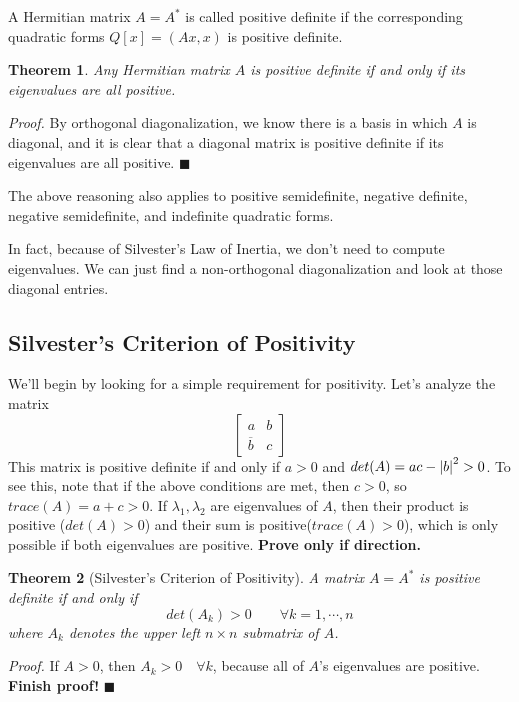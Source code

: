 \documentclass[a4paper,10pt]{book}
\theoremstyle{plain}
\newtheorem{theorem}{Theorem}[section]
\renewenvironment{proof}{\textsl{Proof.}}{\hfill$\blacksquare$}
\theoremstyle{plain}
\theoremstyle{definition}
\begin{document}
A Hermitian matrix $A = A^{*}$ is called positive definite if the corresponding quadratic forms $Q[x] = (Ax, x)$ is positive definite. 

\begin{theorem}
Any Hermitian matrix $A$ is positive definite if and only if its eigenvalues are all positive.
\end{theorem}

\begin{proof}
By orthogonal diagonalization, we know there is a basis in which $A$ is diagonal, and it is clear that a diagonal matrix is positive definite if its eigenvalues are all positive. 
\end{proof}

The above reasoning also applies to positive semidefinite, negative definite, negative semidefinite, and indefinite quadratic forms. 

In fact, because of Silvester's Law of Inertia, we don't need to compute eigenvalues. We can just find a non-orthogonal diagonalization and look at those diagonal entries. 

\subsection{Silvester's Criterion of Positivity}

We'll begin by looking for a simple requirement for positivity. Let's analyze the matrix 
$$\begin{bmatrix}
a & b \\
\overline{b} & c
\end{bmatrix}$$
This matrix is positive definite if and only if $a > 0$ and $det(A)= ac - \abs{b}^{2} > 0$. To see this, note that if the above conditions are met, then $c > 0$, so $trace(A) = a + c > 0$. If $\lambda_{1}, \lambda_{2}$ are eigenvalues of $A$, then their product is positive ($det(A) > 0$) and their sum is positive($trace(A) > 0$), which is only possible if both eigenvalues are positive. \textbf{Prove only if direction.}

\begin{theorem}[Silvester's Criterion of Positivity] 
A matrix $A = A^{*}$ is positive definite if and only if 
$$det(A_{k}) > 0 \qquad \forall k = 1, \cdots, n$$
where $A_{k}$ denotes the upper left $n \times n$ submatrix of $A$. 
\end{theorem}

\begin{proof}
If $A > 0$, then $A_{k} > 0 \quad \forall k$, because all of $A$'s eigenvalues are positive. 
\textbf{Finish proof!}
\end{proof}
\end{document}
